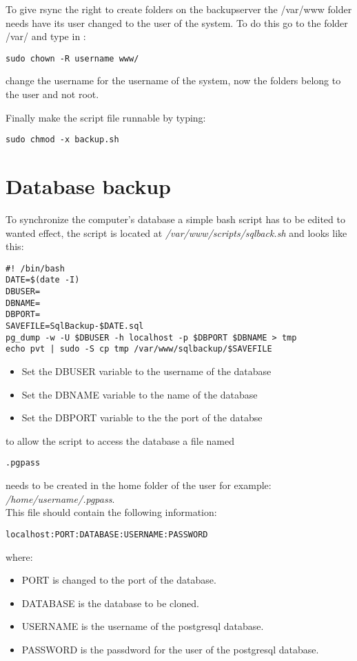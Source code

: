 To give rsync the right to create folders on the backupserver the /var/www folder needs have its user changed to the user of the system. To do this go to the folder /var/ and type in : 
\begin{verbatim}
sudo chown -R username www/
\end{verbatim}
change the username for the username of the system, now the folders belong to the user and not root.

Finally make the script file runnable by typing:
\begin{verbatim}
sudo chmod -x backup.sh
\end{verbatim}


\section{Database backup}
To synchronize the computer's database a simple bash script has to be edited to wanted effect, the script is located at \emph{/var/www/scripts/sqlback.sh} and looks like this:
\begin{verbatim}
#! /bin/bash
DATE=$(date -I)
DBUSER=
DBNAME=
DBPORT=
SAVEFILE=SqlBackup-$DATE.sql
pg_dump -w -U $DBUSER -h localhost -p $DBPORT $DBNAME > tmp
echo pvt | sudo -S cp tmp /var/www/sqlbackup/$SAVEFILE 
\end{verbatim}
\begin{itemize}
\item Set the DBUSER variable to the username of the database
\item Set the DBNAME variable to the name of the database
\item Set the DBPORT variable to the the port of the databse
\end{itemize}
to allow the script to access the database a file named 
\begin{verbatim}
.pgpass
\end{verbatim}
needs to be created in the home folder of the user for example: \\
\emph{/home/username/.pgpass}. \\
This file should contain the following information:
\begin{verbatim}
localhost:PORT:DATABASE:USERNAME:PASSWORD
\end{verbatim}
where:
\begin{itemize}
\item PORT is changed to the port of the database.
\item DATABASE is the database to be cloned.
\item USERNAME is the username of the postgresql database.
\item PASSWORD is the passdword for the user of the postgresql database.
\end{itemize}

